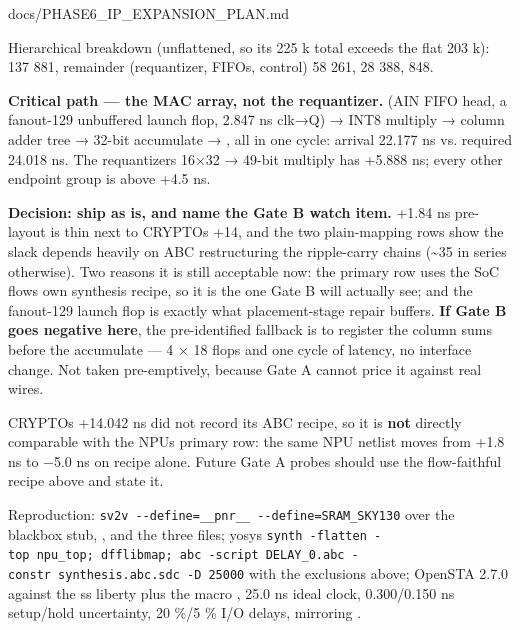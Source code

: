 \begin{relocated}{docs/PHASE6_IP_EXPANSION_PLAN.md}
{}

Hierarchical breakdown (unflattened, so its 225 k total exceeds the flat
203 k):  137 881,  remainder
(requantizer, FIFOs, control) 58 261,  28 388,
 848.

\textbf{Critical path --- the MAC array, not the requantizer.}
 (AIN FIFO head, a fanout-129 unbuffered launch flop,
2.847 ns clk→Q) → INT8 multiply → column adder tree → 32-bit accumulate
→ , all in one cycle: arrival 22.177 ns vs. required
24.018 ns. The requantizer\textquotesingle s 16×32 → 49-bit multiply has
+5.888 ns; every other endpoint group is above +4.5 ns.

\textbf{Decision: ship as is, and name the Gate B watch item.} +1.84 ns
pre-layout is thin next to CRYPTO\textquotesingle s +14, and the two
plain-mapping rows show the slack depends heavily on ABC restructuring
the ripple-carry chains (\textasciitilde35  in series
otherwise). Two reasons it is still acceptable now: the primary row uses
the SoC flow\textquotesingle s own synthesis recipe, so it is the one
Gate B will actually see; and the fanout-129 launch flop is exactly what
placement-stage repair buffers. \textbf{If Gate B goes negative here},
the pre-identified fallback is to register the column sums before the
accumulate --- 4 × 18 flops and one cycle of latency, no interface
change. Not taken pre-emptively, because Gate A cannot price it against
real wires.

\warn{} CRYPTO\textquotesingle s +14.042 ns did not record its ABC
recipe, so it is \textbf{not} directly comparable with the
NPU\textquotesingle s primary row: the same NPU netlist moves from +1.8
ns to −5.0 ns on recipe alone. Future Gate A probes should use the
flow-faithful recipe above and state it.

Reproduction:
\texttt{sv2v\ -\allowbreak{}-\allowbreak{}define=\allowbreak{}\_\allowbreak{}\_\allowbreak{}pnr\_\allowbreak{}\_\allowbreak{}\ -\allowbreak{}-\allowbreak{}define=\allowbreak{}SRAM\_\allowbreak{}SKY130}
over the blackbox stub, ,
 and the three  files; yosys
\texttt{synth\ -\allowbreak{}flatten\ -\allowbreak{}top\ npu\_\allowbreak{}top;\ dfflibmap;\ abc\ -\allowbreak{}script\ DELAY\_\allowbreak{}0.\allowbreak{}abc\ -\allowbreak{}constr\ synthesis.\allowbreak{}abc.\allowbreak{}sdc\ -\allowbreak{}D\ 25000}
with the exclusions above; OpenSTA 2.7.0 against the ss liberty plus the
macro , 25.0 ns ideal clock, 0.300/\allowbreak{}0.150 ns
setup/\allowbreak{}hold uncertainty, 20 \%/5 \% I/O delays, mirroring
.


\end{relocated}
